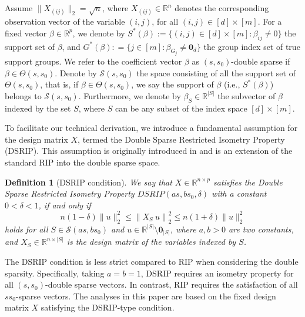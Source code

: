 \documentclass[12pt]{article}
\newtheorem{definition}{Definition}
\begin{document}
Assume $\| X_{(ij)} \|_2  = \sqrt{n}$, where $X_{(ij)}\in \mathbb R^n$ denotes the corresponding observation vector of the variable $(i,j)$, for all $(i,j) \in [d] \times [m]$.
For a fixed vector $\beta \in \mathbb R^p$, we denote by $S^*(\beta)  := \{ (i,j) \in [d] \times [m]: \beta_{ij} \ne 0 \}$ the support set of $\beta$, and $G^*(\beta): = \{j \in [m]: \beta_{G_j}  \ne \mathbf 0_d \}$ the group index set of true support groups.
We refer to the coefficient vector $\beta$ as $(s,s_0)$-double sparse if $\beta \in {\Theta}(s,s_0)$. 
Denote by $\mathcal S (s,s_0) $ the space consisting of all the support set of ${\Theta}(s,s_0)$, that is, if $\beta \in{\Theta}(s,s_0)$, we say the support of $\beta$ (i.e., $S^*(\beta)$) belongs to $\mathcal S (s,s_0) $.
Furthermore, we denote by $\beta_S \in \mathbb R^{|S|}$ the subvector of $\beta$ indexed by the set $S$, where $S$ can be any subset of the index space $[d] \times [m]$.



To facilitate our technical derivation, we introduce a fundamental assumption for the design matrix $X$, termed the Double Sparse Restricted Isometry Property (DSRIP).
This assumption is originally introduced in \cite{LZ22} and is an extension of the standard RIP \citep{candes2006robust} into the double sparse space.
\begin{definition}[DSRIP condition]\label{df2}
We say that $X \in \mathbb R^{n\times p}$ satisfies the Double Sparse Restricted Isometry Property $DSRIP(as,bs_0, \delta)$ with a constant $0 < \delta < 1$, if and only if 
\begin{equation}
    n(1-\delta)\|u\|_2^2  
\leq \left\|X_{S} ~ u\right\|_2^2 
\leq n(1+\delta)\|u\|_2^2
\end{equation}
holds for all $ S \in \mathcal S(as,bs_0)$ and $ u \in  \mathbb{R}^{|S|}\setminus \mathbf 0_{|S|}$, where $a,b>0$ are two constants, and $X_S \in \mathbb R^{n \times |S|}$ is the design matrix of the variables indexed by $S$.
\end{definition}
The DSRIP condition is less strict compared to RIP when considering the double sparsity. 
Specifically, taking $a=b=1$, DSRIP requires an isometry property for all $(s, s_0)$-double sparse vectors. In contrast, RIP requires the satisfaction of all $ss_0$-sparse vectors.
The analyses in this paper are based on the fixed design matrix $X$ satisfying the DSRIP-type condition.
\end{document}
